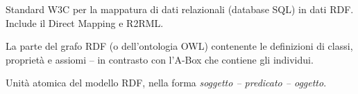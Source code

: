 \documentclass[12pt, a4paper]{report}
\begin{document}
\begin{description}[style=nextline]
  \item[RDB2RDF]
    Standard W3C per la mappatura di dati relazionali (database SQL)
    in dati RDF. Include il Direct Mapping e R2RML.

  \item[T-Box (Terminological Box)]
    La parte del grafo RDF (o dell'ontologia OWL) contenente le
    definizioni di classi, proprietà e assiomi -- in contrasto con
    l'A-Box che contiene gli individui.

  \item[Triple RDF]
    Unità atomica del modello RDF, nella forma
    \textit{soggetto -- predicato -- oggetto}.
\end{description}
\end{document}
